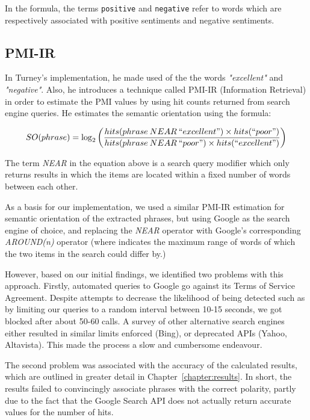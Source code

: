 \documentclass[11pt]{report} %
\begin{document}
In the formula, the terms \verb|positive| and \verb|negative| refer to words which are respectively associated with positive sentiments and negative sentiments. 

\subsection{PMI-IR}
In Turney's implementation, he made used of the the words \textit{"excellent"} and \textit{"negative"}. Also, he introduces a technique called PMI-IR (Information Retrieval) in order to estimate the PMI values by using hit counts returned from search engine queries. He estimates the semantic orientation using the formula:

\begin{equation*} SO(phrase) = \log_2 \left(\frac{hits(phrase \: NEAR \: ``excellent") \times hits(``poor") }{hits(phrase \: NEAR \: ``poor") \times hits(``excellent") }\right) \end{equation*}

The term \textit{NEAR} in the equation above is a search query modifier which only returns results in which the items are located within a fixed number of words between each other. 

As a basis for our implementation, we used a similar PMI-IR estimation for semantic orientation of the extracted phrases, but using Google as the search engine of choice, and replacing the \textit{NEAR} operator with Google's corresponding \textit{AROUND(n)} operator (where  indicates the maximum range of words of which the two items in the search could differ by.)

However, based on our initial findings, we identified two problems with this approach. Firstly, automated queries to Google go against its Terms of Service Agreement. Despite attempts to decrease the likelihood of being detected such as by limiting our queries to a random interval between 10-15 seconds, we got blocked after about 50-60 calls. A survey of other alternative search engines either resulted in similar limits enforced (Bing), or deprecated APIs (Yahoo, Altavista). This made the process a slow and cumbersome endeavour.

The second problem was associated with the accuracy of the calculated results, which are outlined in greater detail in Chapter~\ref{chapter:results}. In short, the results failed to convincingly associate phrases with the correct polarity, partly due to the fact that the Google Search API does not actually return accurate values for the number of hits.
\end{document}
